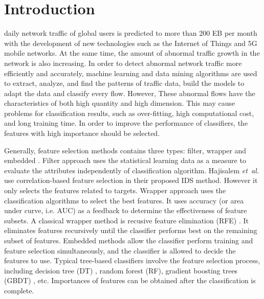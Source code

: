 \documentclass{ieeeaccess}
\theoremstyle{definition}
\begin{document}
\titlepgskip=-15pt

\maketitle


\section{Introduction}
\label{sec:introduction}

 daily network traffic of global users is predicted to more than 200 EB per month \cite{cisco-report} with the development of new technologies such as the Internet of Things and 5G mobile networks. 
At the same time, the amount of abnormal traffic growth in the network is also increasing. 
In order to detect abnormal network traffic more efficiently and accurately, machine learning and data mining algorithms are used to extract, analyze, and find the patterns of traffic data, build the models to adapt the data and classify every flow. 
However, These abnormal flows have the characteristics of both high quantity and high dimension. This may cause problems for classification results, such as over-fitting, high computational cost, and long training time. In order to improve the performance of classifiers, the features with high importance should be selected.

Generally, feature selection methods contains three types: filter, wrapper and embedded \cite{Maza2018, Cai2018}. Filter approach uses the statistical learning data as a measure to evaluate the attributes independently of classification algorithm\cite{Maza2018}. Hajisalem \emph{et~al.} \cite{Hajisalem2018} use correlation-based feature selection in their proposed IDS method. However it only selects the features related to targets. 
Wrapper approach uses the classification algorithms to select the best features. It uses accuracy (or area under curve, i.e. AUC) as a feedback to determine the effectiveness of feature subsets. A classical wrapper method is recusive feature elimination (RFE) \cite{RFE2002}. It eliminates features recursively until the classifier performs best on the remaining subset of features. 
Embedded methods allow the classifier perform training and feature selection simultaneously, and the classifier is allowed to decide the features to use. Typical tree-based classifiers involve the feature selection process, including decision tree (DT) \cite{quinlan2014c4}, random forest (RF)\cite{rf2002}, gradient boosting trees (GBDT) \cite{gbdt2001}, etc. Importances of features can be obtained after the classification is complete.
\end{document}
